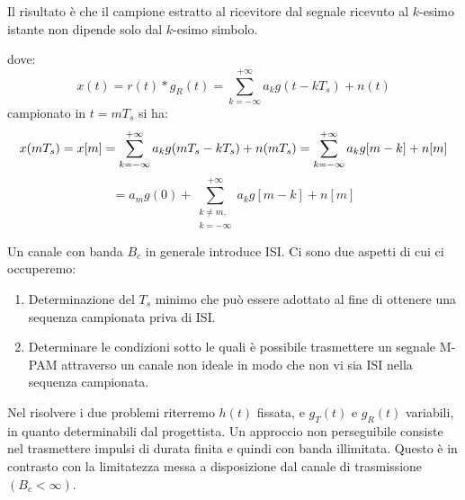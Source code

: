 Il risultato è che il campione estratto al ricevitore dal segnale ricevuto al $k$-esimo istante non dipende solo dal $k$-esimo simbolo.

\begin{center}
\end{center}

dove:
\[
    x(t) = r(t) \ast g_R(t) = \sum_{k=-\infty}^{+\infty} a_k g(t - kT_s) + n(t)
\]
campionato in $t = mT_s$ si ha:
\[
    x(mT_s) = x[m] = \sum_{k=-\infty}^{+\infty} a_k g(mT_s - kT_s) + n(mT_s) = \sum_{k=-\infty}^{+\infty} a_k g[m-k] + n[m] \\
\]
\[
    = a_m g(0) + \sum_{\substack{k \neq m,\\ k=-\infty}}^{+\infty} a_k g[m-k] + n[m]
\]



Un canale con banda \( B_c \) in generale introduce ISI. Ci sono due aspetti di cui ci occuperemo:

\begin{enumerate}
    \item Determinazione del \( T_s \) minimo che può essere adottato al fine di ottenere una sequenza campionata priva di ISI.
    \item Determinare le condizioni sotto le quali è possibile trasmettere un segnale M-PAM attraverso un canale non ideale in modo che non vi sia ISI nella sequenza campionata.
\end{enumerate}

Nel risolvere i due problemi riterremo \( h(t) \) fissata, e \( g_T(t) \) e \( g_R(t) \) variabili, in quanto determinabili dal progettista.
Un approccio non perseguibile consiste nel trasmettere impulsi di durata finita e quindi con banda illimitata. Questo è in contrasto con la limitatezza messa a disposizione dal canale di trasmissione \( (B_c < \infty) \).

